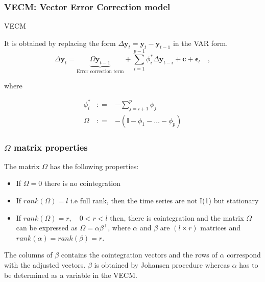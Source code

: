 \documentclass[compress,red]{beamer}
\begin{document}
\begin{frame}
\frametitle{VECM: Vector Error Correction model}
\begin{block}{VECM}

It is obtained by replacing the form {\color{red} $\Delta
\mathbf{y}_t = \mathbf{y}_t - \mathbf{y}_{t-1}$} in the VAR form.
{\color{blue}
\begin{equation}
 \label{eq:vec}
 \Delta \mathbf{y}_t = 
 \underbrace{ \Omega\mathbf{y}_{t-1}}_\text{Error correction term} + 
 \sum_{i=1}^{p-1}
\phi_i^* \Delta \mathbf{y}_{t-i}  + \mathbf{c} + \mathbf{\epsilon}_t \quad ,
\end{equation}}
\end{block}

\noindent where 

\begin{eqnarray*}
\phi_i^* &: =& -\sum_{j=i+1}^{p} \phi_j \\
\Omega &: =& -(\mathbb{I}-\phi_1-\dots-\phi_p) 
\end{eqnarray*}
\end{frame}

\begin{frame}
\frametitle{$\Omega$ matrix properties}
The matrix $\Omega$ has the following properties:
\begin{itemize}
\item If $\Omega = 0$ there is no cointegration
\item If $rank(\Omega)=l$ i.e full rank, then the time series are not
I(1) but stationary
\item If $rank(\Omega)=r,\quad 0 < r < l$ then, there is cointegration
and the matrix $\Omega$ can be expressed as $\Omega =
\alpha \beta^\top$, where $\alpha$ and $\beta$ are $(l \times r)$
matrices and $rank(\alpha)=rank(\beta)=r$.
\end{itemize}
The columns of $\beta$ contains the cointegration vectors and the rows of
$\alpha$ correspond with the adjusted vectors. $\beta$ is obtained by Johansen
procedure whereas $\alpha$ has to be determined as a
variable in the VECM.
\end{frame}
\end{document}
